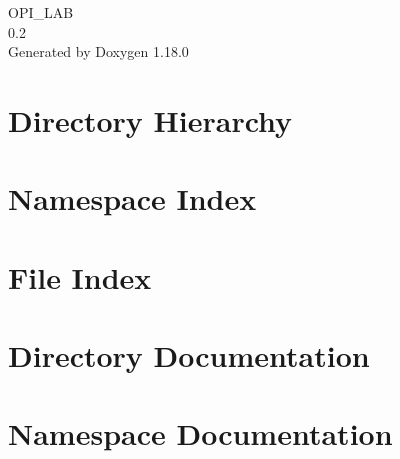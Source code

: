 \documentclass[twoside]{book}
\newcommand{\+}{\discretionary{\mbox{\scriptsize$\hookleftarrow$}}{}{}}
\newcommand{\clearemptydoublepage}{%
    \newpage{\pagestyle{empty}\cleardoublepage}%
  }
\begin{document}
  \raggedbottom
    \hypersetup{pageanchor=false,
                bookmarksnumbered=true,
                pdfencoding=unicode
               }
  \begin{titlepage}
  \vspace*{7cm}
  \begin{center}%
  {\Large OPI\+\_\+\+LAB}\\
  [1ex]\large 0.\+2 \\
  \vspace*{1cm}
  {\large Generated by Doxygen 1.18.0}\\
  \end{center}
  \end{titlepage}
  \clearemptydoublepage
  \tableofcontents
  \clearemptydoublepage
  \hypersetup{pageanchor=true}


\chapter{Directory Hierarchy}

\chapter{Namespace Index}

\chapter{File Index}

\chapter{Directory Documentation}










\chapter{Namespace Documentation}

\end{document}
